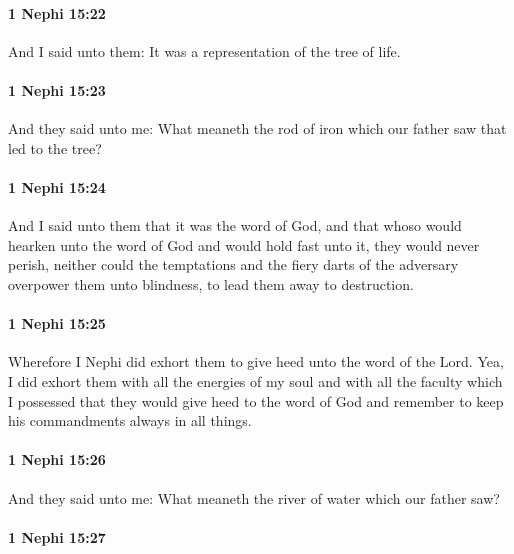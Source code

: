 		\paragraph{1 Nephi 15:22} %
			\label{1NEPHI-15-22}

			And I said unto them:
			It was a representation of the tree of life.

		\paragraph{1 Nephi 15:23} %
			\label{1NEPHI-15-23}

			And they said unto me:
			What meaneth the rod of iron which our father saw that led to the tree?

		\paragraph{1 Nephi 15:24} %
			\label{1NEPHI-15-24}

			And I said unto them that it was the word of God,
			and that whoso would hearken unto the word of God and would hold fast unto it,
			they would never perish,
			neither could the temptations and the fiery darts of the adversary
			overpower them unto blindness,
			to lead them away to destruction.

		\paragraph{1 Nephi 15:25} %
			\label{1NEPHI-15-25}

			Wherefore I Nephi did exhort them to give heed unto the word of the Lord.
			Yea, I did exhort them with all the energies of my soul
			and with all the faculty which I possessed
			that they would give heed to the word of God
			and remember to keep his commandments always in all things.

		\paragraph{1 Nephi 15:26} %
			\label{1NEPHI-15-26}

			And they said unto me:
			What meaneth the river of water which our father saw?

		\paragraph{1 Nephi 15:27} %
			\label{1NEPHI-15-27}

